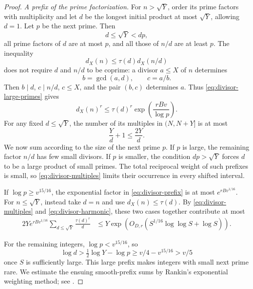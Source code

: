 \begin{proof}
\smallskip
\noindent\emph{A prefix of the prime factorization.}
For \(n>\sqrt Y\), order its prime factors with multiplicity and let
\(d\) be the longest initial product at most \(\sqrt Y\), allowing
\(d=1\). Let \(p\) be the next prime. Then
\[
 d\le\sqrt Y<dp,
\]
all prime factors of \(d\) are at most \(p\), and all those of \(n/d\)
are at least \(p\).
The inequality
\[
 d_X(n)\le \tau(d)d_X(n/d)
\]
does not require \(d\) and \(n/d\) to be coprime:
a divisor \(a\le X\) of \(n\) determines
\[
 b=\gcd(a,d),\qquad c=a/b.
\]
Then \(b\mid d\), \(c\mid n/d\), \(c\le X\), and the pair \((b,c)\)
determines \(a\).
Thus \eqref{eq:divisor-large-primes} gives
\begin{equation}\label{eq:divisor-prefix}
 d_X(n)^r\le\tau(d)^r
          \exp\left(\frac{rBv}{\log p}\right).
\end{equation}
For any fixed \(d\le\sqrt Y\), the number of its multiples in
\((N,N+Y]\) is at most
\begin{equation}\label{eq:divisor-multiples}
 \frac Yd+1\le\frac{2Y}{d}.
\end{equation}
We now sum according to the size of the next prime \(p\). If \(p\)
is large, the remaining factor \(n/d\) has few small divisors. If
\(p\) is smaller, the condition \(dp>\sqrt Y\) forces \(d\) to
be a large product of small primes. The total reciprocal weight of
such prefixes is small, so \eqref{eq:divisor-multiples} limits their
occurrence in every shifted interval.

If \(\log p\ge v^{15/16}\), the exponential factor in
\eqref{eq:divisor-prefix} is at most \(e^{rBv^{1/16}}\).
For \(n\le\sqrt Y\), instead take \(d=n\) and use
\(d_X(n)\le\tau(d)\). By \eqref{eq:divisor-multiples} and
\eqref{eq:divisor-harmonic}, these two cases together contribute at most
\begin{align}
 2Ye^{rBv^{1/16}}\sum_{d\le\sqrt Y}\frac{\tau(d)^r}{d}
 &\le Y\exp\!\left(
      O_{D,r}(S^{1/16}\log\log S+\log S)\right).
 \label{eq:divisor-large-contribution}
\end{align}

For the remaining integers, \(\log p<v^{15/16}\), so
\begin{equation}\label{eq:divisor-prefix-lower}
 \log d>\tfrac12\log Y-\log p
 \ge v/4-v^{15/16}>v/5
\end{equation}
once \(S\) is sufficiently large.
This large prefix makes integers with small next prime rare.
We estimate the ensuing smooth-prefix sums by Rankin's exponential
weighting method; see \cite[p.~414, (1.3)]{HildebrandTenenbaum1993}.


\end{proof}
